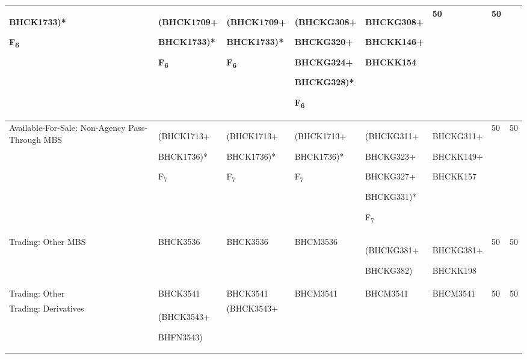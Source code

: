 \begin{landscape}
\begin{longtable}{|>{\raggedright}p{3cm}|>{\raggedright}p{2.2cm}|>{\raggedright}p{2.2cm}|>{\raggedright}p{2.2cm}|>{\raggedright}p{2.5cm}|>{\raggedright}p{2.5cm}|>{\raggedright}p{1cm}|>{\raggedright}p{1cm}|}
BHCK1733){*}

F\textsubscript{6}  & (BHCK1709+

BHCK1733){*}

F\textsubscript{6}  & (BHCK1709+

BHCK1733){*}

F\textsubscript{6}  & (BHCKG308+

BHCKG320+

BHCKG324+

BHCKG328){*}

F\textsubscript{6}  & BHCKG308+

BHCKK146+

BHCKK154  & 50  & 50\tabularnewline
\hline 
Available-For-Sale: Non-Agency Pass-Through MBS  & (BHCK1713+

BHCK1736){*}

F\textsubscript{7}  & (BHCK1713+

BHCK1736){*}

F\textsubscript{7}  & (BHCK1713+

BHCK1736){*}

F\textsubscript{7}  & (BHCKG311+

BHCKG323+

BHCKG327+

BHCKG331){*}

F\textsubscript{7}  & BHCKG311+

BHCKK149+

BHCKK157  & 50  & 50\tabularnewline
\hline 
Trading: Other MBS  & BHCK3536  & BHCK3536  & BHCM3536  & (BHCKG381+

BHCKG382)  & BHCKG381+

BHCKK198  & 50  & 50\tabularnewline
\hline 
Trading: Other  & BHCK3541  & BHCK3541  & BHCM3541  & BHCM3541  & BHCM3541  & 50  & 50\tabularnewline
\hline 
Trading: Derivatives  & (BHCK3543+

BHFN3543)  & (BHCK3543+


\end{longtable}
\end{landscape}
